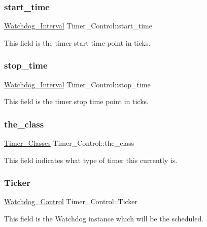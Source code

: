 \subsubsection{\texorpdfstring{start\_time}{start\_time}}
{\footnotesize\ttfamily \mbox{\hyperlink{group__RTEMSScoreWatchdog_gaa1834fd7531ca9bb5c4ca6fd990388d5}{Watchdog\+\_\+\+Interval}} Timer\+\_\+\+Control\+::start\+\_\+time}

This field is the timer start time point in ticks. \mbox{\label{structTimer__Control_a001a34f5da3d8f5c32aa1dd915036238}} 
\subsubsection{\texorpdfstring{stop\_time}{stop\_time}}
{\footnotesize\ttfamily \mbox{\hyperlink{group__RTEMSScoreWatchdog_gaa1834fd7531ca9bb5c4ca6fd990388d5}{Watchdog\+\_\+\+Interval}} Timer\+\_\+\+Control\+::stop\+\_\+time}

This field is the timer stop time point in ticks. \mbox{\label{structTimer__Control_a171f8c6a229c8e164a6afcea60eddbf8}} 
\subsubsection{\texorpdfstring{the\_class}{the\_class}}
{\footnotesize\ttfamily \mbox{\hyperlink{group__ClassicTimer_gaca88ac1e833f63ec72d38e07677f2f27}{Timer\+\_\+\+Classes}} Timer\+\_\+\+Control\+::the\+\_\+class}

This field indicates what type of timer this currently is. \mbox{\label{structTimer__Control_af8273d326d21dce1423b3e5d2fb91f88}} 
\subsubsection{\texorpdfstring{Ticker}{Ticker}}
{\footnotesize\ttfamily \mbox{\hyperlink{structWatchdog__Control}{Watchdog\+\_\+\+Control}} Timer\+\_\+\+Control\+::\+Ticker}

This field is the Watchdog instance which will be the scheduled. \mbox{\label{structTimer__Control_acb492bec9d582d0b5d68b9746f8837b5}} 
